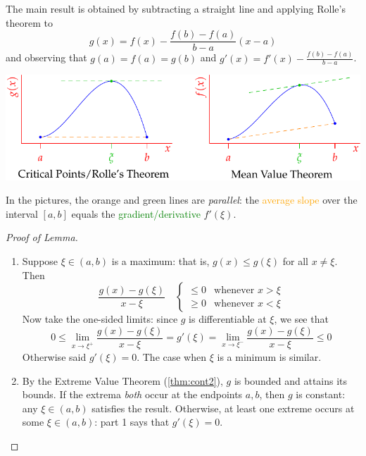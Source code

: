 The main result is obtained by subtracting a straight line and applying Rolle's theorem to
\[
	g(x)=f(x)-\frac{f(b)-f(a)}{b-a}(x-a)
\]
and observing that $g(a)=f(a)=g(b)$ and $g'(x)=f'(x)-\frac{f(b)-f(a)}{b-a}$.

\begin{center}
	\includegraphics[scale=0.95]{mvt}
\end{center}

In the pictures, the orange and green lines are \emph{parallel}: the \textcolor{orange}{average slope} over the interval $[a,b]$ equals the \textcolor{Green}{gradient/derivative} $f'(\xi)$.

\begin{proof}[Proof of Lemma]
	\begin{enumerate}%
%
		\item Suppose $\xi\in(a,b)$ is a maximum: that is, $g(x)\le g(\xi)$ for all $x\neq\xi$. Then
		\[
			\frac{g(x)-g(\xi)}{x-\xi}\quad
			\begin{cases}
				\le 0&\text{whenever }x>\xi\\
				\ge 0&\text{whenever }x<\xi
			\end{cases}
		\]
		Now take the one-sided limits: since $g$ is differentiable at $\xi$, we see that
		\[
			0\le \lim_{x\to\xi^+}\frac{g(x)-g(\xi)}{x-\xi}
			=g'(\xi)=
			\lim_{x\to\xi^-}\frac{g(x)-g(\xi)}{x-\xi}\le 0
		\]
		Otherwise said $g'(\xi)=0$. The case when $\xi$ is a minimum is similar. 
		
	  \item By the Extreme Value Theorem (\ref{thm:cont2}), $g$ is bounded and attains its bounds.
	  If the extrema \emph{both} occur at the endpoints $a,b$, then $g$ is constant: any $\xi\in(a,b)$ satisfies the result.	Otherwise, at least one extreme occurs at some $\xi\in(a,b)$: part 1 says that $g'(\xi)=0$.\hfill\qedhere
	\end{enumerate}
\end{proof}

